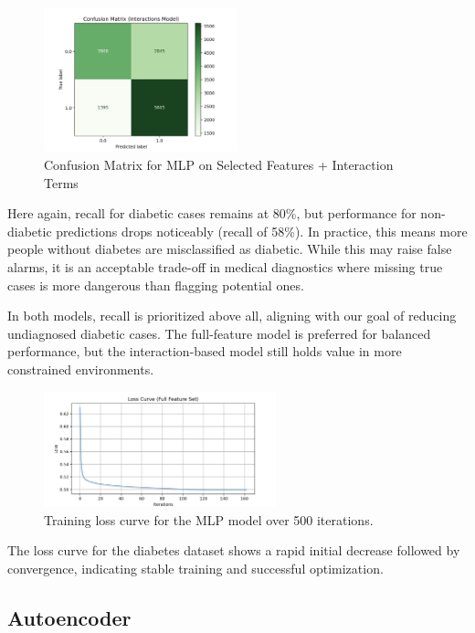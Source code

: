 \begin{figure}[H]
    \centering
    \includegraphics[width=0.5\textwidth]{images/confusion_matrix_interactions.png}
    \caption{Confusion Matrix for MLP on Selected Features + Interaction Terms}
\end{figure}

\noindent
Here again, recall for diabetic cases remains at 80\%, but performance for non-diabetic predictions drops noticeably (recall of 58\%). In practice, this means more people without diabetes are misclassified as diabetic. While this may raise false alarms, it is an acceptable trade-off in medical diagnostics where missing true cases is more dangerous than flagging potential ones.

\vspace{1em}
\noindent
In both models, recall is prioritized above all, aligning with our goal of reducing undiagnosed diabetic cases. The full-feature model is preferred for balanced performance, but the interaction-based model still holds value in more constrained environments.

\begin{figure}[H]
    \centering
    \includegraphics[width=0.6\textwidth]{images/mlp-loss-curve.png} 
    \caption{Training loss curve for the MLP model over 500 iterations.}
    \label{fig:mlp_loss_curve}
    \end{figure}

The loss curve for the diabetes dataset shows a rapid initial decrease followed by convergence, indicating stable training and successful optimization.


\subsection{Autoencoder}

